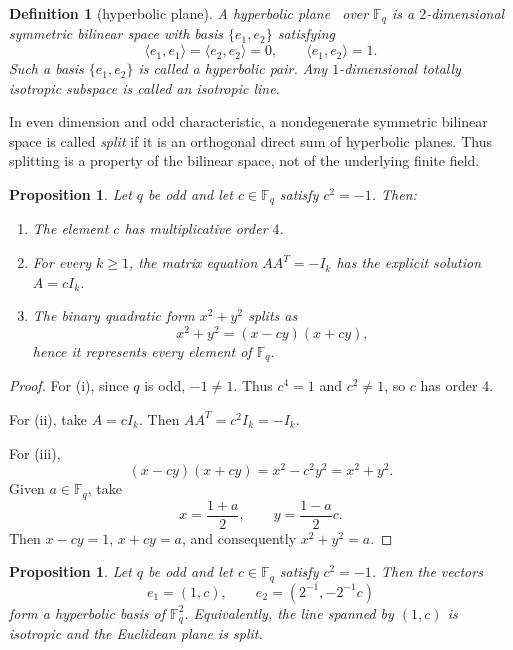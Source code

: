 \documentclass[12pt]{article}
\newtheorem{defn}{Definition}[section]
\newtheorem{prop}[theorem]{Proposition}
\newcommand{\F}{\mathbb{F}}
\begin{document}
\begin{defn}[hyperbolic plane]\label{def:hyp}
{\rm
A hyperbolic plane~\cite{Ser} over $\F_q$ is a $2$-dimensional symmetric bilinear space with basis $\{e_1,e_2\}$ satisfying
\[
\langle e_1,e_1\rangle = \langle e_2,e_2\rangle = 0,
\qquad
\langle e_1,e_2\rangle = 1.
\]
Such a basis \(\{e_1,e_2\}\) is called a hyperbolic pair. Any $1$-dimensional totally isotropic subspace is called an isotropic line.
}
\end{defn}

In even dimension and odd characteristic, a nondegenerate symmetric
bilinear space is called \emph{split} if it is an orthogonal direct sum of
hyperbolic planes. Thus splitting is a property of the bilinear space, not
of the underlying finite field.

\begin{prop}\label{prop:split-consequences}
Let \(q\) be odd and let \(c\in\F_q\) satisfy \(c^2=-1\). Then:
\begin{enumerate}[label=(\roman*)]
\item The element $c$ has multiplicative order $4$.
\item For every $k \ge 1$, the matrix equation $AA^T = -I_k$ has the explicit solution $A=cI_k$.
\item The binary quadratic form $x^2+y^2$ splits as
\[
x^2+y^2 = (x-cy)(x+cy),
\]
hence it represents every element of\/ $\F_q$.
\end{enumerate}
\end{prop}

\begin{proof}
For (i), since \(q\) is odd, \(-1\ne1\). Thus \(c^4=1\) and
\(c^2\ne1\), so \(c\) has order \(4\).

For (ii), take \(A=cI_k\). Then
\(AA^T=c^2I_k=-I_k\).

For (iii),
\[
(x-cy)(x+cy)=x^2-c^2y^2=x^2+y^2.
\]
Given \(a\in\F_q\), take
\[
x=\frac{1+a}{2},\qquad y=\frac{1-a}{2}c.
\]
Then \(x-cy=1\), \(x+cy=a\), and consequently
\(x^2+y^2=a\).
\end{proof}


\begin{prop}\label{prop:eucl-hyp}
Let \(q\) be odd and let \(c\in\F_q\) satisfy \(c^2=-1\). Then the vectors
\[
e_1=(1,c), \qquad e_2=(2^{-1},-2^{-1}c)
\]
form a hyperbolic basis of\/ $\F_q^2$. Equivalently, the line spanned by $(1,c)$ is isotropic and the Euclidean plane is split.
\end{prop}
\end{document}
